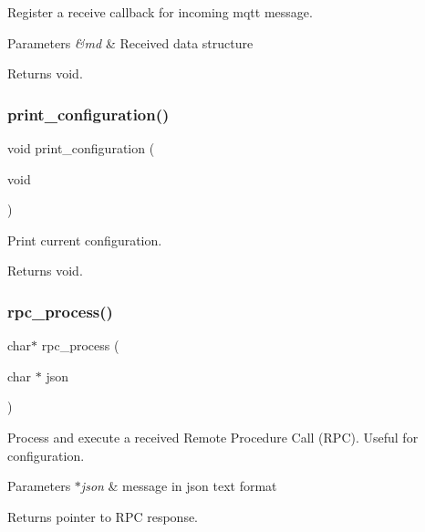 Register a receive callback for incoming mqtt message. 


\begin{DoxyParams}{Parameters}
{\em \&md} & Received data structure \\
\hline
\end{DoxyParams}
\begin{DoxyReturn}{Returns}
void. 
\end{DoxyReturn}
\mbox{\label{rmap_8ino_a65b2dadc0411e43874ec8ed7f73bc62a}} 
\subsubsection{\texorpdfstring{print\+\_\+configuration()}{print\_configuration()}}
{\footnotesize\ttfamily void print\+\_\+configuration (\begin{DoxyParamCaption}\item[{void}]{ }\end{DoxyParamCaption})}



Print current configuration. 

\begin{DoxyReturn}{Returns}
void. 
\end{DoxyReturn}
\mbox{\label{rmap_8ino_a99f56f4c38f64be47b52818cbf57bb2d}} 
\subsubsection{\texorpdfstring{rpc\+\_\+process()}{rpc\_process()}}
{\footnotesize\ttfamily char$\ast$ rpc\+\_\+process (\begin{DoxyParamCaption}\item[{char $\ast$}]{json }\end{DoxyParamCaption})}



Process and execute a received Remote Procedure Call (R\+PC). Useful for configuration. 


\begin{DoxyParams}{Parameters}
{\em $\ast$json} & message in json text format \\
\hline
\end{DoxyParams}
\begin{DoxyReturn}{Returns}
pointer to R\+PC response. 
\end{DoxyReturn}
\mbox{\label{rmap_8ino_a17374e428acd4fc86f2b8a8ede54deca}} 
